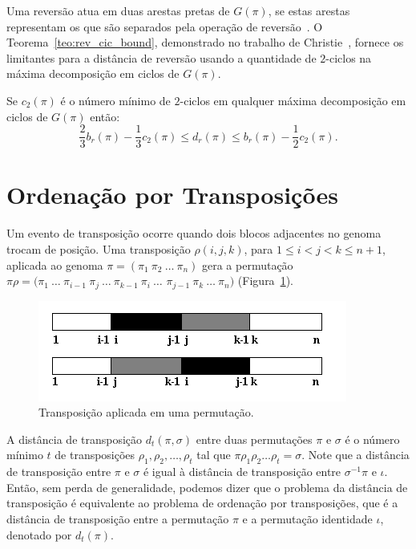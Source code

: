 Uma reversão atua em duas arestas pretas de $G(\pi)$, se estas arestas
representam os \bkp{} que são separados pela operação de
reversão~\cite{Christie*1998}. O Teorema~\ref{teo:rev_cic_bound},
demonstrado no trabalho de Christie~\cite{Christie*1998}, fornece os
limitantes para a distância de reversão usando a quantidade de
$2$-ciclos na máxima decomposição em ciclos de $G(\pi)$.

\begin{teo}
\label{teo:rev_cic_bound}
Se $c_{2}(\pi)$ é o número mínimo de $2$-ciclos em qualquer máxima
decomposição em ciclos de $G(\pi)$ então: 
\[
\frac{2}{3} b_r(\pi)
- \frac{1}{3} c_{2}(\pi) \leq d_r(\pi) \leq b_r(\pi) - \frac{1}{2}
c_{2}(\pi).
\]
\end{teo}

\section{Ordenação por Transposições}
\label{sec:trans}
Um evento de transposição ocorre quando dois blocos adjacentes no
genoma trocam de posição. Uma transposição $\rho(i, j, k)$, para
$1 \leq i < j < k \leq n + 1$, aplicada ao genoma $\pi =
(\pi_{1}~\pi_{2}~\ldots~\pi_{n})$ gera a permutação $\pi\rho =
(\pi_{1}~\ldots~\pi_{i-1}~\pi_{j}~\ldots~\pi_{k-1}~\pi_{i}~\ldots$
$\pi_{j-1}~\pi_{k}~\ldots~\pi_{n})$ (Figura~\ref{fig:transposition}).

\begin{figure}[h]
  \centering
  \includegraphics{images/transposition.png} 
  \caption{Transposição aplicada em uma permutação.}
  \label{fig:transposition}
\end{figure}

A distância de transposição $d_{t}(\pi, \sigma)$ entre duas
permutações $\pi$ e $\sigma$ é o número mínimo $t$ de transposições
$\rho_{1}, \rho_{2}, \ldots, \rho_{t}$ tal que
$\pi \rho_{1} \rho_{2} \ldots \rho_{t} = \sigma$. Note que a distância
de transposição entre $\pi$ e $\sigma$ é igual à distância de transposição
entre $\sigma^{-1} \pi$ e $\iota$. Então, sem perda de generalidade,
podemos dizer que o problema da distância de transposição é
equivalente ao problema de ordenação por transposições, que é a
distância de transposição entre a permutação $\pi$ e a permutação
identidade $\iota$, denotado por $d_{t}(\pi)$.

